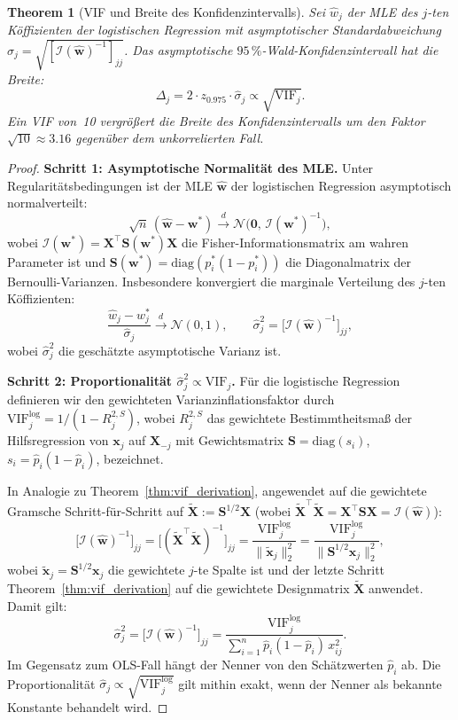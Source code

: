 ﻿\documentclass[12pt, a4paper]{article}
\newtheorem{theorem}{Theorem}[section]
\theoremstyle{definition}
\theoremstyle{remark}
\newcommand{\vw}{\bm{w}}
\newcommand{\vx}{\bm{x}}
\newcommand{\vX}{\bm{X}}
\newcommand{\vS}{\bm{S}}
\newcommand{\T}{\top}
\newcommand{\diag}{\mathrm{diag}}
\begin{document}
\begin{theorem}[VIF und Breite des Konfidenzintervalls]
	\label{thm:vif_ci}
	Sei $\hat{w}_j$ der MLE des $j$-ten Köffizienten der logistischen Regression mit
	asymptotischer Standardabweichung $\hat{\sigma}_j = \sqrt{[\mathcal{I}(\hat{\vw})^{-1}]_{jj}}$.
	Das asymptotische $95\,\%$-Wald-Konfidenzintervall hat die Breite:
	\begin{equation}
		\Delta_j = 2 \cdot z_{0.975} \cdot \hat{\sigma}_j \propto \sqrt{\mathrm{VIF}_j}.
		\label{eq:ci_width}
	\end{equation}
	Ein VIF von~10 vergrößert die Breite des Konfidenzintervalls um den Faktor $\sqrt{10} \approx 3.16$
	gegenüber dem unkorrelierten Fall.
\end{theorem}

\begin{proof}
	\textbf{Schritt 1: Asymptotische Normalität des MLE.}
	Unter Regularitätsbedingungen ist der MLE $\hat{\vw}$ der logistischen Regression
	asymptotisch normalverteilt:
	\[
	\sqrt{n}\,(\hat{\vw} - \vw^*) \xrightarrow{d} \mathcal{N}\!\bigl(\bm{0},\,\mathcal{I}(\vw^*)^{-1}\bigr),
	\]
	wobei $\mathcal{I}(\vw^*) = \vX^\T\vS(\vw^*)\vX$ die Fisher-Informationsmatrix am wahren
	Parameter ist und $\vS(\vw^*) = \diag(p_i^*(1-p_i^*))$ die Diagonalmatrix der Bernoulli-Varianzen.
	Insbesondere konvergiert die marginale Verteilung des $j$-ten Köffizienten:
	\[
	\frac{\hat{w}_j - w_j^*}{\hat{\sigma}_j} \xrightarrow{d} \mathcal{N}(0,1),
	\qquad \hat{\sigma}_j^2 = \bigl[\mathcal{I}(\hat{\vw})^{-1}\bigr]_{jj},
	\]
	wobei $\hat{\sigma}_j^2$ die geschätzte asymptotische Varianz ist.
	
	\textbf{Schritt 2: Proportionalität $\hat{\sigma}_j^2 \propto \mathrm{VIF}_j$.}
	Für die logistische Regression definieren wir den gewichteten Varianzinflationsfaktor durch
	$\mathrm{VIF}_j^{\mathrm{log}} = 1/(1 - R_j^{2,S})$, wobei $R_j^{2,S}$ das gewichtete
	Bestimmtheitsmaß der Hilfsregression von $\vx_j$ auf $\vX_{-j}$ mit Gewichtsmatrix
	$\vS = \diag(s_i)$, $s_i = \hat{p}_i(1-\hat{p}_i)$, bezeichnet.
	
	In Analogie zu Theorem~\ref{thm:vif_derivation}, angewendet auf die gewichtete Gramsche
	Schritt-für-Schritt auf $\tilde{\vX} := \vS^{1/2}\vX$ (wobei $\tilde{\vX}^\T\tilde{\vX} = \vX^\T\vS\vX = \mathcal{I}(\hat{\vw})$):
	\[
	\bigl[\mathcal{I}(\hat{\vw})^{-1}\bigr]_{jj}
	= \bigl[(\tilde{\vX}^\T\tilde{\vX})^{-1}\bigr]_{jj}
	= \frac{\mathrm{VIF}_j^{\mathrm{log}}}{\|\tilde{\vx}_j\|_2^2}
	= \frac{\mathrm{VIF}_j^{\mathrm{log}}}{\|\vS^{1/2}\vx_j\|_2^2},
	\]
	wobei $\tilde{\vx}_j = \vS^{1/2}\vx_j$ die gewichtete $j$-te Spalte ist und der letzte Schritt
	Theorem~\ref{thm:vif_derivation} auf die gewichtete Designmatrix $\tilde{\vX}$ anwendet.
	Damit gilt:
	\begin{equation}
		\hat{\sigma}_j^2 = \bigl[\mathcal{I}(\hat{\vw})^{-1}\bigr]_{jj}
		= \frac{\mathrm{VIF}_j^{\mathrm{log}}}{\sum_{i=1}^n \hat{p}_i(1-\hat{p}_i)\,x_{ij}^2}.
		\label{eq:sigma_vif_log}
	\end{equation}
	Im Gegensatz zum OLS-Fall hängt der Nenner von den Schätzwerten $\hat{p}_i$ ab. Die
	Proportionalität $\hat{\sigma}_j \propto \sqrt{\mathrm{VIF}_j^{\mathrm{log}}}$ gilt mithin
	exakt, wenn der Nenner als bekannte Konstante behandelt wird.
	

\end{proof}
\end{document}
